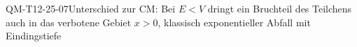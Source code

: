 
\begin{CONC}{QM-T12-25-07}{Unterschied zur CM: Bei $E<V$ dringt ein Bruchteil des Teilchens auch in das verbotene Gebiet $x>0$, klassisch exponentieller Abfall mit Eindingstiefe}
\end{CONC}
